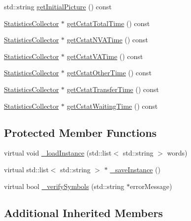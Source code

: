 \begin{DoxyCompactItemize}
\item 
std\+::string \hyperlink{class_entity_type_a9a464c546bc2f7fe56fbea9b761ac1f7}{get\+Initial\+Picture} () const 
\item 
\hyperlink{class_statistics_collector}{Statistics\+Collector} $\ast$ \hyperlink{class_entity_type_a26d54afffb7437890cccd4b5447bb7e4}{get\+Cstat\+Total\+Time} () const 
\item 
\hyperlink{class_statistics_collector}{Statistics\+Collector} $\ast$ \hyperlink{class_entity_type_a48e1dedd3e7d7b198ee4e7a61c6afb7e}{get\+Cstat\+N\+V\+A\+Time} () const 
\item 
\hyperlink{class_statistics_collector}{Statistics\+Collector} $\ast$ \hyperlink{class_entity_type_aafb65d3cdceae776da454989b7b4a874}{get\+Cstat\+V\+A\+Time} () const 
\item 
\hyperlink{class_statistics_collector}{Statistics\+Collector} $\ast$ \hyperlink{class_entity_type_a8b6a8b11d428c9e23800d01701e7fbd1}{get\+Cstat\+Other\+Time} () const 
\item 
\hyperlink{class_statistics_collector}{Statistics\+Collector} $\ast$ \hyperlink{class_entity_type_a2604288226dd7fc0c6c322d415b891cc}{get\+Cstat\+Transfer\+Time} () const 
\item 
\hyperlink{class_statistics_collector}{Statistics\+Collector} $\ast$ \hyperlink{class_entity_type_ae43feed54cd8661efb317ef4891bcfcf}{get\+Cstat\+Waiting\+Time} () const 
\end{DoxyCompactItemize}
\subsection*{Protected Member Functions}
\begin{DoxyCompactItemize}
\item 
virtual void \hyperlink{class_entity_type_af88c3d67f9eb8b92b4e32e04bed6730f}{\+\_\+load\+Instance} (std\+::list$<$ std\+::string $>$ words)
\item 
virtual std\+::list$<$ std\+::string $>$ $\ast$ \hyperlink{class_entity_type_a4f6179d5043e750d9555d6eeef8de4cd}{\+\_\+save\+Instance} ()
\item 
virtual bool \hyperlink{class_entity_type_a50e21c4807823132e777529c70bf7cef}{\+\_\+verify\+Symbols} (std\+::string $\ast$error\+Message)
\end{DoxyCompactItemize}
\subsection*{Additional Inherited Members}


